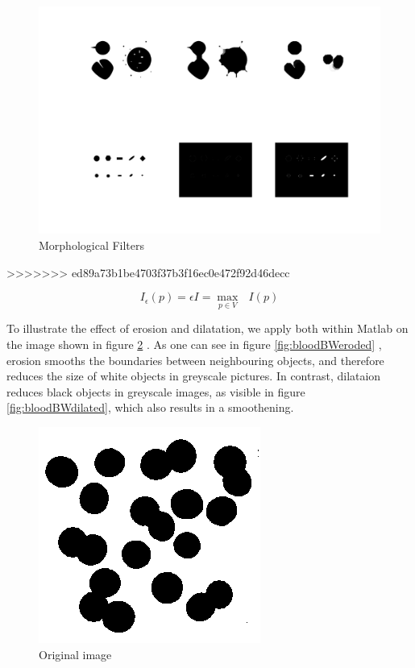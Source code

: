 \begin{figure}
	\centering
	\includegraphics[width=\textwidth]{images/morphFilter.png}
	\caption{Morphological Filters}
	\label{fig:morphFilt}
\end{figure}
>>>>>>> ed89a73b1be4703f37b3f16ec0e472f92d46decc

\begin{equation*}
I_{\epsilon}(p)=\epsilon I = \underset{p \in V}\max \text{ } I(p)
\end{equation*}

To illustrate the effect of erosion and dilatation, we apply both within Matlab on the image shown in figure \ref{fig:bloodBW} . As one can see in figure \ref{fig:bloodBWeroded} , erosion smooths the boundaries between neighbouring objects, and therefore reduces the size of white objects in greyscale pictures. In contrast, dilataion reduces black objects in greyscale images, as visible in figure \ref{fig:bloodBWdilated}, which also results in a smoothening.

\begin{figure}[H]
	\centering
		\includegraphics[scale=0.5]{images/bloodBW.png}
		\caption{Original image}
		\label{fig:bloodBW}
\end{figure}

